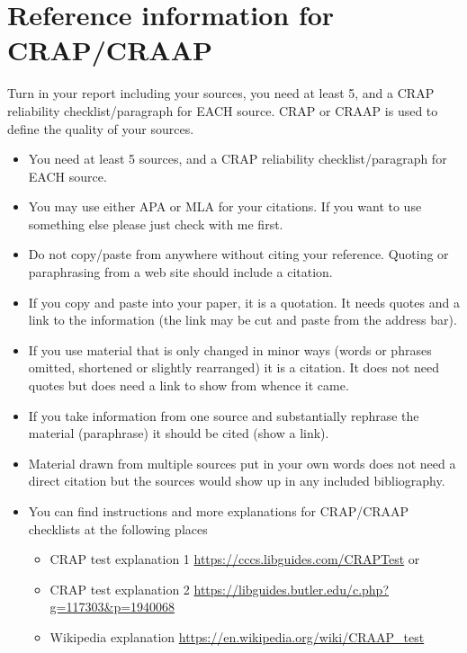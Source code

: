 \documentclass[12pt]{article}
\begin{document}
    

\section*{Reference information for CRAP/CRAAP}
    
    Turn in your report including your sources, you need at least 5, and a CRAP reliability checklist/paragraph for EACH  source. CRAP or CRAAP is used to define the quality of your sources. 
    \begin{itemize}

        \item You need at least 5 sources, and a CRAP reliability checklist/paragraph for EACH  source. 
        \item You may use either APA or MLA for your citations. If you want to use something else please just check with me first.
        \item Do not copy/paste from anywhere without citing your reference. Quoting or paraphrasing from a web site should include a citation.
        \item If you copy and paste into your paper, it is a quotation. It needs quotes and a link to the information (the link may be cut and paste from the address bar).
        \item If you use material that is only changed in minor ways (words or phrases omitted, shortened or slightly rearranged) it is a citation. It does not need quotes but does need a link to show from whence it came.
        \item If you take information from one source and substantially rephrase the material (paraphrase) it should be cited (show a link).
        \item Material drawn from multiple sources put in your own words does not need a direct citation but the sources would show up in any included bibliography.
         \item You can find instructions and more explanations for CRAP/CRAAP checklists at the following places
        \begin{itemize}
            \item CRAP test explanation 1 \url{ https://cccs.libguides.com/CRAPTest} or 
            \item CRAP test explanation 2 \url{https://libguides.butler.edu/c.php?g=117303&p=1940068} 
            \item Wikipedia explanation \url{https://en.wikipedia.org/wiki/CRAAP_test}
        \end{itemize}
    \end{itemize}    
\end{document}
